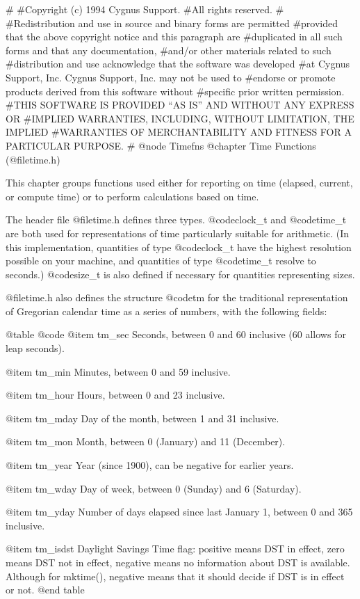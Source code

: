 #
#Copyright (c) 1994 Cygnus Support.
#All rights reserved.
#
#Redistribution and use in source and binary forms are permitted
#provided that the above copyright notice and this paragraph are
#duplicated in all such forms and that any documentation,
#and/or other materials related to such
#distribution and use acknowledge that the software was developed
#at Cygnus Support, Inc.  Cygnus Support, Inc. may not be used to
#endorse or promote products derived from this software without
#specific prior written permission.
#THIS SOFTWARE IS PROVIDED ``AS IS'' AND WITHOUT ANY EXPRESS OR
#IMPLIED WARRANTIES, INCLUDING, WITHOUT LIMITATION, THE IMPLIED
#WARRANTIES OF MERCHANTABILITY AND FITNESS FOR A PARTICULAR PURPOSE.
#
@node Timefns
@chapter Time Functions (@file{time.h})

This chapter groups functions used either for reporting on time
(elapsed, current, or compute time) or to perform calculations based
on time.

The header file @file{time.h} defines three types.  @code{clock_t} and
@code{time_t} are both used for representations of time particularly
suitable for arithmetic.  (In this implementation, quantities of type
@code{clock_t} have the highest resolution possible on your machine,
and quantities of type @code{time_t} resolve to seconds.)  @code{size_t}
is also defined if necessary for quantities representing sizes. 

@file{time.h} also defines the structure @code{tm} for the traditional
representation of Gregorian calendar time as a series of numbers, with
the following fields: 

@table @code
@item tm_sec
Seconds, between 0 and 60 inclusive (60 allows for leap seconds).

@item tm_min
Minutes, between 0 and 59 inclusive.

@item tm_hour
Hours, between 0 and 23 inclusive.

@item tm_mday
Day of the month, between 1 and 31 inclusive.

@item tm_mon
Month, between 0 (January) and 11 (December).

@item tm_year
Year (since 1900), can be negative for earlier years.

@item tm_wday
Day of week, between 0 (Sunday) and 6 (Saturday).

@item tm_yday
Number of days elapsed since last January 1, between 0 and 365 inclusive.

@item tm_isdst
Daylight Savings Time flag: positive means DST in effect, zero means DST
not in effect, negative means no information about DST is available.
Although for mktime(), negative means that it should decide if DST is in
effect or not.
@end table

